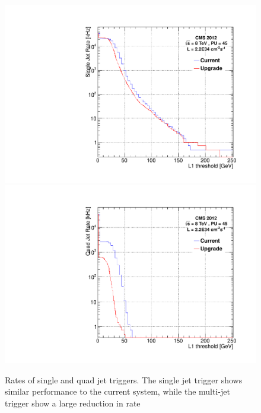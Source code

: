 \begin{figure}[t!]
\begin{center}
  \includegraphics[scale=0.3]{Figures/l1jets/singleJetRates_2e34.pdf}
    \includegraphics[scale=0.3]{Figures/l1jets/quadJetRates_2e34.pdf}
\caption{Rates of single and quad jet triggers. The single jet trigger shows similar performance to the current system, while the multi-jet trigger show a large reduction in rate}
\label{JetRate_L1}
\end{center}
\end{figure}

